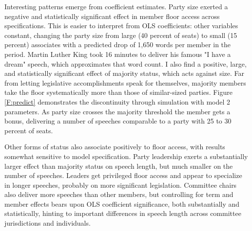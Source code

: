 \documentclass[letter,12pt]{article}
\begin{document}

Interesting patterns emerge from coefficient estimates. Party size exerted a negative and statistically significant effect in member floor access across specifications. This is easier to interpret from OLS coefficients: other variables constant, changing the party size from large (40 percent of seats) to small (15 percent) associates with a predicted drop of 1,650 words per member in the period. Martin Luther King took 16 minutes to deliver his famous "I have a dream" speech, which approximates that word count. I also find a positive, large, and statistically significant effect of majority status, which acts against size. Far from letting legislative accomplishments speak for themselves, majority members take the floor systematically more than those of similar-sized parties. Figure \ref{F:predict} demonstrates the discontinuity through simulation with model 2 parameters. As party size crosses the majority threshold the member gets a bonus, delivering a number of speeches comparable to a party with 25 to 30 percent of seats.


Other forms of status also associate positively to floor access, with results somewhat sensitive to model specification. Party leadership exerts a substantially larger effect than majority status on speech length, but much smaller on the number of speeches. Leaders get privileged floor access and appear to specialize in longer speeches, probably on more significant legislation. Committee chairs also deliver more speeches than other members, but controlling for term and member effects bears upon OLS coefficient significance, both substantially and statistically, hinting to important differences in speech length across committee jurisdictions and individuals.
\end{document}
